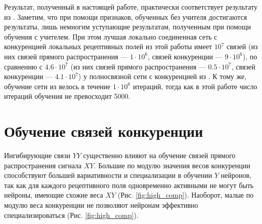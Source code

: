 \documentclass[a4paper]{article}
\begin{document}
Результат, полученный в настоящей работе, практически соответствует результату из \cite{saunders2019locally}. Заметим, что при помощи признаков, обученных без учителя достигаются результаты, лишь немногим уступающие результатам, полученным при помощи обучения с учителем. При этом лучшая локально соединенная сеть с конкуренцией локальных рецептивных полей из этой работы имеет $10^7$ связей (из них связей прямого распространения --- $1 \cdot 10^6$, связей конкуренции --- $9 \cdot 10^6$), по сравнению с $4.6 \cdot 10^7$ (из них связей прямого распространения --- $0.5 \cdot 10^7$, связей конкуренции --- $4.1 \cdot 10^7$) у полносвязной сети с конкуренцией из \cite{mnist2}. К тому же, обучение сети из \cite{mnist2} велось в течение $1 \cdot 10^6$ итераций, тогда как в этой работе число итераций обучения не превосходит 5000.

\section{Обучение связей конкуренции}
Ингибирующие связи $YY$ существенно влияют на обучение связей прямого распространения сигнала $XY$. Большие по модулю значения весов конкуренции способствуют большей вариативности и специализации в обучении $Y$ нейронов, так как для каждого рецептивного поля одновременно активными не могут быть нейроны, имеющие схожие веса $XY$ (Рис. \ref{fig:high_comp}). Наоборот, малые по модулю веса конкуренции не позволяют нейронам эффективно специализироваться (Рис. \ref{fig:high_comp}).
\end{document}
